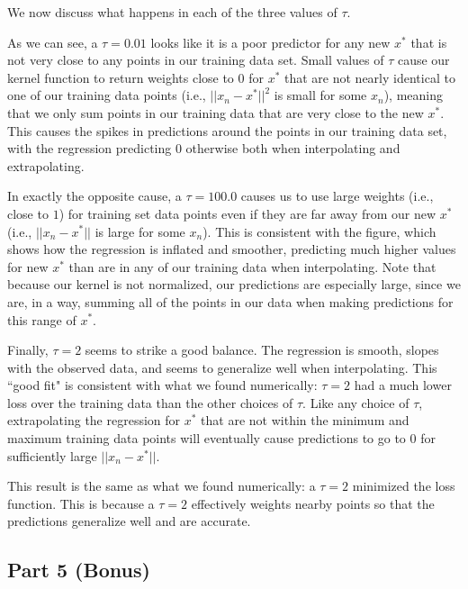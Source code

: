 \documentclass[submit]{harvardml}
\begin{document}
\noindent We now discuss what happens in each of the three values of $\tau$.

As we can see, a $\tau = 0.01$ looks like it is a poor predictor for any new $x^*$ that is not very close to any points in our training data set. Small values of $\tau$ cause our kernel function to return weights close to $0$ for $x^*$ that are not nearly identical to one of our training data points (i.e., $||x_n - x^*||^2$ is small for some $x_n$), meaning that we only sum points in our training data that are very close to the new $x^*$. This causes the spikes in predictions around the points in our training data set, with the regression predicting $0$ otherwise both when interpolating and extrapolating.

In exactly the opposite cause, a $\tau = 100.0$ causes us to use large weights (i.e., close to $1$) for training set data points even if they are far away from our new $x^*$ (i.e., $||x_n - x^*||$ is large for some $x_n$). This is consistent with the figure, which shows how the regression is inflated and smoother, predicting much higher values for new $x^*$ than are in any of our training data when interpolating. Note that because our kernel is not normalized, our predictions are especially large, since we are, in a way, summing all of the points in our data when making predictions for this range of $x^*$.

Finally, $\tau = 2$ seems to strike a good balance. The regression is smooth, slopes with the observed data, and seems to generalize well when interpolating. This ``good fit" is consistent with what we found numerically: $\tau = 2$ had a much lower loss over the training data than the other choices of $\tau$. Like any choice of $\tau$, extrapolating the regression for $x^*$ that are not within the minimum and maximum training data points will eventually cause predictions to go to $0$ for sufficiently large $||x_n - x^*||$.

This result is the same as what we found numerically: a $\tau = 2$ minimized the loss function. This is because a $\tau = 2$ effectively weights nearby points so that the predictions generalize well and are accurate.

\subsection{Part 5 (Bonus)}
\end{document}
